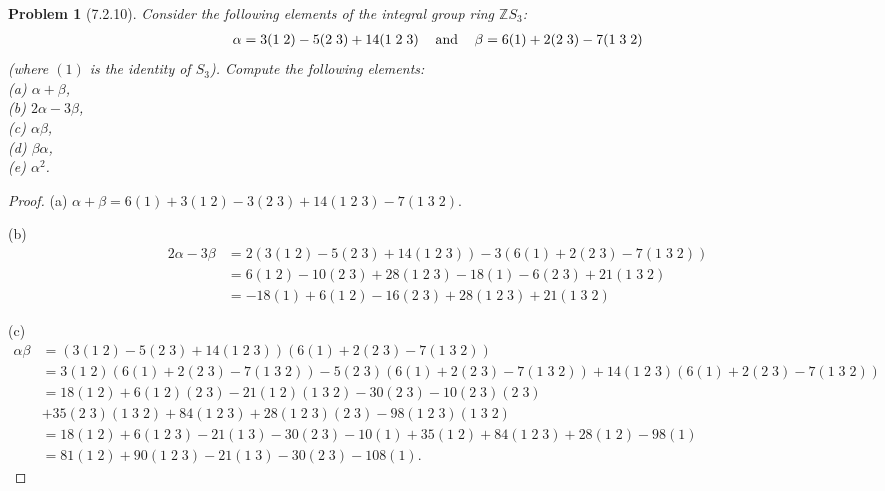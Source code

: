 \documentclass{article}
\newtheorem{problem}{Problem}
\begin{document}
\begin{problem}[7.2.10]
Consider the following elements of the integral group ring $\mathbb{Z}S_3$:
\[
\begin{tabular}{ccc}
$\alpha = 3(1 \; 2) - 5(2 \; 3) + 14(1 \; 2 \; 3)$ & and & $\beta = 6(1) + 2(2 \; 3) - 7(1 \; 3 \; 2)$
\end{tabular}
\]
(where $(1)$ is the identity of $S_3$). Compute the following elements:\\
(a) $\alpha + \beta$,\\
(b) $2\alpha - 3\beta$,\\
(c) $\alpha\beta$,\\
(d) $\beta\alpha$,\\
(e) $\alpha^2$.
\end{problem}
\begin{proof}
(a) $\alpha + \beta = 6(1) + 3 (1 \; 2) - 3 (2 \; 3) + 14 (1 \; 2 \; 3) - 7 (1 \; 3 \; 2)$.

(b)
\begin{align*}
2\alpha - 3\beta
&= 2(3(1 \; 2) - 5(2 \; 3) + 14(1 \; 2 \; 3)) - 3(6(1) + 2(2 \; 3) - 7(1 \; 3 \; 2))\\
&= 6(1 \; 2) - 10(2 \; 3) + 28(1\; 2 \; 3) - 18(1) - 6(2 \; 3) + 21(1 \; 3 \; 2)\\
&= -18(1) + 6(1 \; 2) - 16(2 \; 3) + 28(1 \; 2 \; 3) + 21(1 \; 3 \; 2)
\end{align*}

(c)
\begin{align*}
\alpha \beta
&= (3(1 \; 2) - 5(2 \; 3) + 14(1 \; 2 \; 3)) (6(1) + 2(2 \; 3) - 7(1 \; 3 \; 2))\\
&= 3(1 \; 2)(6(1) + 2(2 \; 3) - 7(1 \; 3 \; 2)) - 5(2 \; 3)(6(1) + 2(2 \; 3) - 7(1 \; 3 \; 2)) + 14(1 \; 2 \; 3)(6(1) + 2(2 \; 3) - 7(1 \; 3 \; 2))\\
&= 18(1 \; 2) + 6(1 \; 2)(2 \; 3) - 21(1 \; 2)(1 \; 3 \; 2) - 30(2 \; 3) - 10(2 \; 3)(2 \; 3)\\
&+ 35(2 \; 3)(1 \; 3 \; 2) + 84(1 \; 2 \; 3) + 28(1 \; 2 \; 3)(2 \; 3) - 98(1 \; 2 \; 3)(1 \; 3 \; 2)\\
&= 18(1 \; 2) + 6(1 \; 2 \; 3) - 21(1 \; 3) - 30(2 \; 3) - 10(1) + 35(1 \; 2) + 84(1 \; 2 \; 3) + 28(1 \; 2) - 98(1)\\
&= 81(1 \; 2) + 90(1 \; 2 \; 3) - 21(1 \; 3) - 30(2 \; 3) - 108(1).
\end{align*}


\end{proof}
\end{document}
